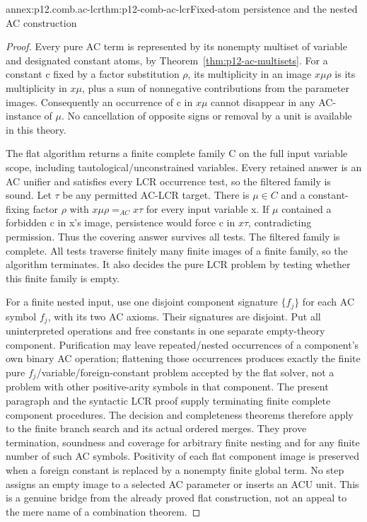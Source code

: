 \begin{annexitem}{annex:p12.comb.ac-lcr}{thm:p12-comb-ac-lcr}{Fixed-atom persistence and the nested AC construction}
\begin{proof}
Every pure AC term is represented by its nonempty multiset of variable
and designated constant atoms, by Theorem~\ref{thm:p12-ac-multisets}.
For a constant c fixed by a factor substitution \(\rho\), its
multiplicity in an image \(x\mu\rho\) is its multiplicity in
\(x\mu\), plus a sum of nonnegative contributions from the
parameter images. Consequently an occurrence of c in \(x\mu\)
cannot disappear in any AC-instance of \(\mu\). No cancellation
of opposite signs or removal by a unit is available in this theory.

The flat algorithm returns a finite complete family C on the full
input variable scope, including tautological/unconstrained variables.
Every retained answer is an AC unifier and satisfies every LCR
occurrence test, so the filtered family is sound. Let \(\tau\) be
any permitted AC-LCR target. There is \(\mu\in C\) and a
constant-fixing factor \(\rho\) with
\(x\mu\rho=_{AC}x\tau\) for every input variable x.
If \(\mu\) contained a forbidden c in x's image, persistence
would force c in \(x\tau\), contradicting permission. Thus the
covering answer survives all tests. The filtered family is complete.
All tests traverse finitely many finite images of a finite family,
so the algorithm terminates. It also decides the pure LCR problem
by testing whether this finite family is empty.

For a finite nested input, use one disjoint component signature
\(\{f_j\}\) for each AC symbol \(f_j\), with its two AC axioms.
Their signatures are disjoint. Put all uninterpreted operations and
free constants in one separate empty-theory component. Purification
may leave repeated/nested occurrences of a component's own binary
AC operation; flattening those occurrences produces exactly the
finite pure \(f_j\)/variable/foreign-constant problem accepted by the
flat solver, not a problem with other positive-arity symbols in
that component. The present paragraph and the syntactic LCR proof
supply terminating finite complete component procedures.
The decision and completeness theorems therefore apply to the
finite branch search and its actual ordered merges. They prove
termination, soundness and coverage for arbitrary finite nesting
and for any finite number of such AC symbols. Positivity of each
flat component image is preserved when a foreign constant is
replaced by a nonempty finite global term. No step assigns an
empty image to a selected AC parameter or inserts an ACU unit.
This is a genuine bridge from the already proved flat construction,
not an appeal to the mere name of a combination theorem.
\end{proof}
\end{annexitem}


